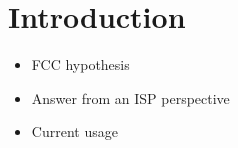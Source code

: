 \section{Introduction}
\label{sec:intro}
\begin{itemize}
\item FCC hypothesis
\item Answer from an ISP perspective
\item Current usage
\end{itemize}






